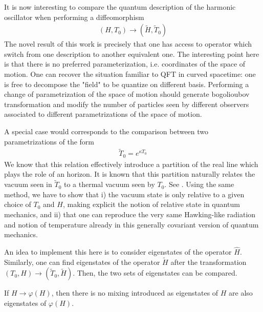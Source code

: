 \documentclass[onecolumn,notitlepage,superscriptaddress, nofootinbib,nobibnotes, aps,prd,10pt]{revtex4-1}%
\def\be{\begin{eqnarray}}
\def\ee{\end{eqnarray}}
\begin{document}
It is now interesting to compare the quantum description of the harmonic oscillator when performing a diffeomorphism 
\be
(H, T_0) \rightarrow  (\tilde{H}, \tilde{T}_0)
\ee
The novel result of this work is precisely that one has access to operator which switch from one description to another equivalent one. The interesting point here is that there is no preferred parameterization, i.e. coordinates of the space of motion. One can recover the situation familiar to QFT in curved spacetime: one is free to decompose the "field" to be quantize on different basis. Performing a change of parametrization of the space of motion should generate bogolioubov transformation and modify the number of particles seen by different observers associated to different parametrizations of the space of motion.

A special case would corresponds to the comparison between two parametrizations of the form
\be
\tilde{T}_0 = e^{\kappa T_0}
\ee
We know that this relation effectively introduce a partition of the real line which plays the role of an horizon. It is known that this partition naturally relates the vacuum seen in $\tilde{T}_0$ to a thermal vacuum  seen by $T_0$. See \cite{Arzano:2018oby,Arzano:2020mhg}. Using the same method, we have to show that i) the vacuum state is only relative to a given choice of $T_0$ and $H$, making explicit the notion of relative state in quantum mechanics, and ii) that one can reproduce the very same Hawking-like radiation and notion of temperature already in this generally covariant version of quantum mechanics. 

An idea to implement this here is to consider eigenstates of the operator $\hat{H}$. Similarly, one can find eigenstates of the operator $\tilde{H}$ after the transformation $(T_0,H)\rightarrow (\tilde{T}_0,\tilde{H})$. Then, the two sets of eigenstates can be compared.

If $H\rightarrow \varphi(H)$, then there is no mixing introduced as eigenstates of $H$ are also eigenstates of $\varphi(H)$.
\end{document}
